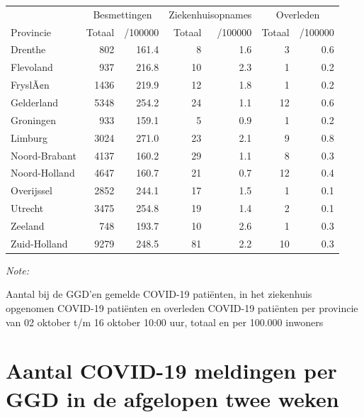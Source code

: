 \documentclass[
  english,
  man,floatsintext]{apa6}
\begin{document}
\begin{table}
\centering
\begin{threeparttable}
\begin{tabular}{lrrrrrr}
\toprule
\multicolumn{1}{c}{ } & \multicolumn{2}{c}{Besmettingen} & \multicolumn{2}{c}{Ziekenhuisopnames} & \multicolumn{2}{c}{Overleden} \\
\cmidrule(l{3pt}r{3pt}){2-3} \cmidrule(l{3pt}r{3pt}){4-5} \cmidrule(l{3pt}r{3pt}){6-7}
Provincie & Totaal & /100000 & Totaal & /100000 & Totaal & /100000\\
\midrule
Drenthe & 802 & 161.4 & 8 & 1.6 & 3 & 0.6\\
Flevoland & 937 & 216.8 & 10 & 2.3 & 1 & 0.2\\
FryslÃ¢n & 1436 & 219.9 & 12 & 1.8 & 1 & 0.2\\
Gelderland & 5348 & 254.2 & 24 & 1.1 & 12 & 0.6\\
Groningen & 933 & 159.1 & 5 & 0.9 & 1 & 0.2\\
Limburg & 3024 & 271.0 & 23 & 2.1 & 9 & 0.8\\
Noord-Brabant & 4137 & 160.2 & 29 & 1.1 & 8 & 0.3\\
Noord-Holland & 4647 & 160.7 & 21 & 0.7 & 12 & 0.4\\
Overijssel & 2852 & 244.1 & 17 & 1.5 & 1 & 0.1\\
Utrecht & 3475 & 254.8 & 19 & 1.4 & 2 & 0.1\\
Zeeland & 748 & 193.7 & 10 & 2.6 & 1 & 0.3\\
Zuid-Holland & 9279 & 248.5 & 81 & 2.2 & 10 & 0.3\\
\bottomrule
\end{tabular}
\begin{tablenotes}
\item \textit{Note: } 
\item Aantal bij de GGD’en gemelde COVID-19 patiënten, in het ziekenhuis opgenomen COVID-19 patiënten en overleden COVID-19 patiënten per provincie van 02 oktober t/m 16 oktober 10:00 uur, totaal en per 100.000 inwoners
\end{tablenotes}
\end{threeparttable}
\end{table}

\newpage

\hypertarget{aantal-covid-19-meldingen-per-ggd-in-de-afgelopen-twee-weken}{%
\section{Aantal COVID-19 meldingen per GGD in de afgelopen twee weken}\label{aantal-covid-19-meldingen-per-ggd-in-de-afgelopen-twee-weken}}
\end{document}
